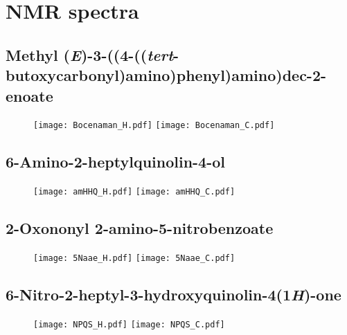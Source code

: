 
\section{NMR spectra}

\subsection{Methyl (\textit{E})-3-((4-((\textit{tert}-butoxycarbonyl)amino)phenyl)amino)dec-2-enoate }

\begin{figure}[H]
	\centering
		\texttt{[image: Bocenaman\_H.pdf]}
		\texttt{[image: Bocenaman\_C.pdf]}
\end{figure}

\subsection{6-Amino-2-heptylquinolin-4-ol }

\begin{figure}[H]
	\centering
		\texttt{[image: amHHQ\_H.pdf]}
		\texttt{[image: amHHQ\_C.pdf]}
\end{figure}

\subsection{2-Oxononyl 2-amino-5-nitrobenzoate }

\begin{figure}[H]
	\centering
		\texttt{[image: 5Naae\_H.pdf]}
		\texttt{[image: 5Naae\_C.pdf]}
\end{figure}

\subsection{6-Nitro-2-heptyl-3-hydroxyquinolin-4(1\textit{H})-one }

\begin{figure}[H]
	\centering
		\texttt{[image: NPQS\_H.pdf]}
		\texttt{[image: NPQS\_C.pdf]}
\end{figure}

